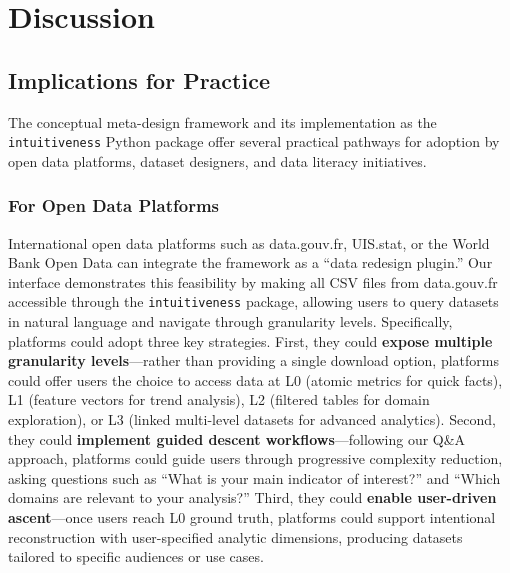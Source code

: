 \documentclass[12pt,a4paper]{article}
\begin{document}
\section{Discussion}
\label{sec:discussion}

\subsection{Implications for Practice}


The conceptual meta-design framework and its implementation as the \texttt{intuitiveness} Python package offer several practical pathways for adoption by open data platforms, dataset designers, and data literacy initiatives.

\subsubsection{For Open Data Platforms}

International open data platforms such as data.gouv.fr, UIS.stat, or the World Bank Open Data can integrate the framework as a ``data redesign plugin.'' Our interface demonstrates this feasibility by making all CSV files from data.gouv.fr accessible through the \texttt{intuitiveness} package, allowing users to query datasets in natural language and navigate through granularity levels. Specifically, platforms could adopt three key strategies. First, they could \textbf{expose multiple granularity levels}---rather than providing a single download option, platforms could offer users the choice to access data at L0 (atomic metrics for quick facts), L1 (feature vectors for trend analysis), L2 (filtered tables for domain exploration), or L3 (linked multi-level datasets for advanced analytics). Second, they could \textbf{implement guided descent workflows}---following our Q\&A approach, platforms could guide users through progressive complexity reduction, asking questions such as ``What is your main indicator of interest?'' and ``Which domains are relevant to your analysis?'' Third, they could \textbf{enable user-driven ascent}---once users reach L0 ground truth, platforms could support intentional reconstruction with user-specified analytic dimensions, producing datasets tailored to specific audiences or use cases.
\end{document}
